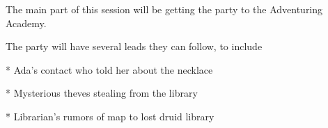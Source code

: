 The main part of this session will be getting the party to the Adventuring Academy.

The party will have several leads they can follow, to include

* Ada's contact who told her about the necklace

* Mysterious theves stealing from the library

* Librarian's rumors of map to lost druid library